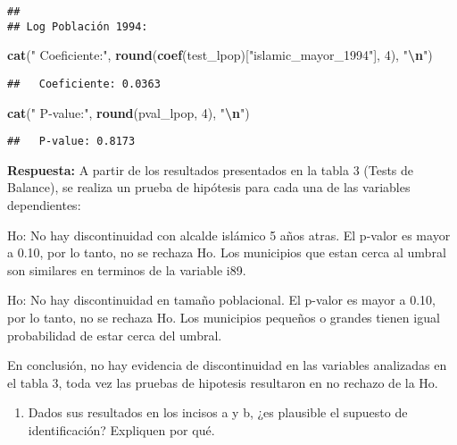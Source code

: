 \documentclass[
]{article}
\newenvironment{Shaded}{\begin{snugshade}}{\end{snugshade}}
\newcommand{\DecValTok}[1]{\textcolor[rgb]{0.00,0.00,0.81}{#1}}
\newcommand{\FunctionTok}[1]{\textcolor[rgb]{0.13,0.29,0.53}{\textbf{#1}}}
\newcommand{\NormalTok}[1]{#1}
\newcommand{\SpecialCharTok}[1]{\textcolor[rgb]{0.81,0.36,0.00}{\textbf{#1}}}
\newcommand{\StringTok}[1]{\textcolor[rgb]{0.31,0.60,0.02}{#1}}
\providecommand{\tightlist}{%
  \setlength{\itemsep}{0pt}\setlength{\parskip}{0pt}}
\begin{document}
\begin{verbatim}
## 
## Log Población 1994:
\end{verbatim}

\begin{Shaded}
\begin{Highlighting}[]
\FunctionTok{cat}\NormalTok{(}\StringTok{"  Coeficiente:"}\NormalTok{, }\FunctionTok{round}\NormalTok{(}\FunctionTok{coef}\NormalTok{(test\_lpop)[}\StringTok{"islamic\_mayor\_1994"}\NormalTok{], }\DecValTok{4}\NormalTok{), }\StringTok{"}\SpecialCharTok{\textbackslash{}n}\StringTok{"}\NormalTok{)}
\end{Highlighting}
\end{Shaded}

\begin{verbatim}
##   Coeficiente: 0.0363
\end{verbatim}

\begin{Shaded}
\begin{Highlighting}[]
\FunctionTok{cat}\NormalTok{(}\StringTok{"  P{-}value:"}\NormalTok{, }\FunctionTok{round}\NormalTok{(pval\_lpop, }\DecValTok{4}\NormalTok{), }\StringTok{"}\SpecialCharTok{\textbackslash{}n}\StringTok{"}\NormalTok{)}
\end{Highlighting}
\end{Shaded}

\begin{verbatim}
##   P-value: 0.8173
\end{verbatim}

\textbf{Respuesta:} A partir de los resultados presentados en la tabla 3
(Tests de Balance), se realiza un prueba de hipótesis para cada una de
las variables dependientes:

Ho: No hay discontinuidad con alcalde islámico 5 años atras. El p-valor
es mayor a 0.10, por lo tanto, no se rechaza Ho. Los municipios que
estan cerca al umbral son similares en terminos de la variable i89.

Ho: No hay discontinuidad en tamaño poblacional. El p-valor es mayor a
0.10, por lo tanto, no se rechaza Ho. Los municipios pequeños o grandes
tienen igual probabilidad de estar cerca del umbral.

En conclusión, no hay evidencia de discontinuidad en las variables
analizadas en el tabla 3, toda vez las pruebas de hipotesis resultaron
en no rechazo de la Ho.

\begin{enumerate}
\def\labelenumi{\alph{enumi})}
\setcounter{enumi}{2}
\tightlist
\item
  Dados sus resultados en los incisos a y b, ¿es plausible el supuesto
  de identificación? Expliquen por qué.
\end{enumerate}
\end{document}
